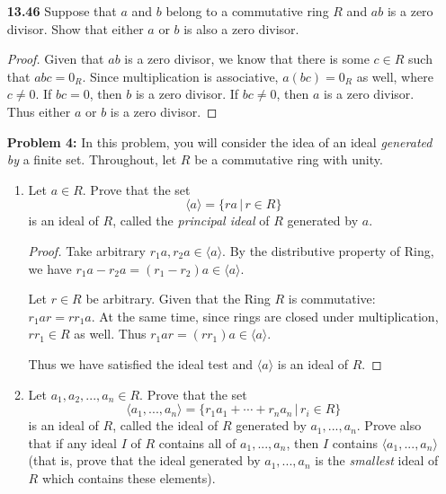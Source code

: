 \documentclass[11pt, oneside]{article}
\begin{document}
\begin{enumerate}
\begin{proof}
Thus for every other nonzero element of $F$, it must share the same additive order with 1. Since $F$ is also a commutative group under addition. The order of $F$ must divide the order of element , thus the order of $F $ can only be multiple of $p$. Thus $|F|=p^n$ for some positive n. 
\end{proof}

\newpage
\item[{\bf 13.46}] Suppose that $a$ and $b$ belong to a commutative ring $R$ and $ab$ is a zero divisor. Show that either $a$ or $b$ is also a zero divisor.
\begin{proof}
Given that $ab$ is a zero divisor, we know that there is some $c\in R$ such that $abc=0_R$. Since multiplication is associative, $a(bc)=0_R$ as well, where $c\neq 0$. If $bc=0$, then $b$ is a zero divisor. If $bc\neq 0$, then $a$ is a zero divisor. Thus either $a$ or $b$ is a zero divisor. 
\end{proof}



\newpage
\item[{\bf Problem 4:}] In this problem, you will consider the idea of an ideal {\it generated by} a finite set. Throughout, let $R$ be a commutative ring with unity.

\begin{enumerate}
\item Let $a\in R$. Prove that the set $$\langle a \rangle = \{ra\,|\, r\in R\}$$ is an ideal of $R$, called the {\it principal ideal} of $R$ generated by $a$.  
\begin{proof}
Take arbitrary $r_1a, r_2a\in \langle a \rangle$. By the distributive property of Ring, we have $r_1a-r_2a=(r_1-r_2)a\in \langle a \rangle$. 

Let $r\in R$ be arbitrary. Given that the Ring $R$ is commutative: $r_1ar=rr_1a$. At the same time, since rings are closed under multiplication, $rr_1\in R$ as well. Thus $r_1ar=(rr_1)a\in \langle a \rangle$.

Thus we have satisfied the ideal test and $\langle a \rangle$ is an ideal of $R$.
\end{proof}
\item Let $a_1,a_2,...,a_n\in R$. Prove that the set $$\langle a_1,...,a_n \rangle = \{r_1a_1+\cdots + r_na_n\,|\, r_i\in R\}$$ is an ideal of $R$, called the ideal of $R$ generated by $a_1,...,a_n$.  Prove also that if any ideal $I$ of $R$ contains all of $a_1,...,a_n$, then $I$ contains $\langle a_1,...,a_n\rangle$ (that is, prove that the ideal generated by $a_1,...,a_n$ is the {\it smallest} ideal of $R$ which contains these elements).


\end{enumerate}
\end{enumerate}
\end{document}

